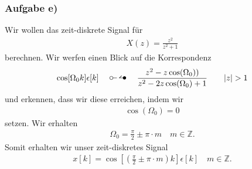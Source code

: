 \subsubsection{Aufgabe e)}
Wir wollen das zeit-diskrete Signal für
\begin{align}
	X(z)=\frac{z^2}{z^2+1}
\end{align}
berechnen.
Wir werfen einen Blick auf die Korrespondenz 
\begin{align}
	\cos [\Omega_0k]\epsilon[k]\quad\ztransf\quad \frac{z^2-z\cos(\Omega_0))}{z^2-2z\cos(\Omega_0)+1}\quad\quad |z| > 1
\end{align}
und erkennen, dass wir diese erreichen, indem wir
\begin{align}
	\cos(\Omega_0)=0
\end{align}
setzen.
Wir erhalten
\begin{align}
	\Omega_0 = \frac{\pi}{2} \pm \pi \cdot m \quad m \in \mathbb{Z}.
\end{align}
Somit erhalten wir unser zeit-diskretes Signal
\begin{align}
	x[k]=\cos[(\frac{\pi}{2}\pm \pi\cdot m)k]\epsilon[k]\quad m \in \mathbb{Z}.
\end{align}
